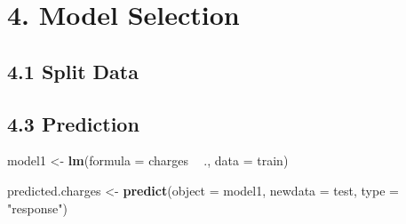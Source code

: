 \documentclass[]{article}
\newenvironment{Shaded}{\begin{snugshade}}{\end{snugshade}}
\newcommand{\KeywordTok}[1]{\textcolor[rgb]{0.13,0.29,0.53}{\textbf{#1}}}
\newcommand{\DataTypeTok}[1]{\textcolor[rgb]{0.13,0.29,0.53}{#1}}
\newcommand{\DecValTok}[1]{\textcolor[rgb]{0.00,0.00,0.81}{#1}}
\newcommand{\FloatTok}[1]{\textcolor[rgb]{0.00,0.00,0.81}{#1}}
\newcommand{\StringTok}[1]{\textcolor[rgb]{0.31,0.60,0.02}{#1}}
\newcommand{\CommentTok}[1]{\textcolor[rgb]{0.56,0.35,0.01}{\textit{#1}}}
\newcommand{\OperatorTok}[1]{\textcolor[rgb]{0.81,0.36,0.00}{\textbf{#1}}}
\newcommand{\NormalTok}[1]{#1}
\begin{document}
\section{4. Model Selection}\label{model-selection}

\subsection{4.1 Split Data}\label{split-data}

\begin{Shaded}
\end{Shaded}

\subsection{4.3 Prediction}\label{prediction}

\begin{Shaded}
\begin{Highlighting}[]
\NormalTok{model1 <-}\StringTok{ }\KeywordTok{lm}\NormalTok{(}\DataTypeTok{formula =}\NormalTok{ charges }\OperatorTok{~}\StringTok{ }\NormalTok{.,}
             \DataTypeTok{data =}\NormalTok{ train)}
\end{Highlighting}
\end{Shaded}

\begin{Shaded}
\begin{Highlighting}[]
\NormalTok{predicted.charges <-}\StringTok{ }\KeywordTok{predict}\NormalTok{(}\DataTypeTok{object =}\NormalTok{ model1, }\DataTypeTok{newdata =}\NormalTok{ test, }\DataTypeTok{type =} \StringTok{"response"}\NormalTok{)}
\end{Highlighting}
\end{Shaded}
\end{document}
